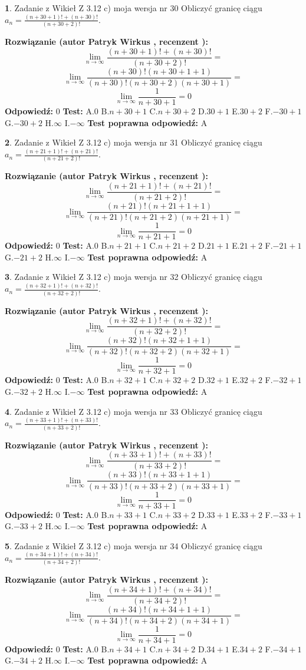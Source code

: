 \documentclass[12pt, a4paper]{article}
\theoremstyle{definition} %
\newtheorem{zad}{}
\newcommand{\zadStart}[1]{\begin{zad}#1\newline}
\newcommand{\zadStop}{\end{zad}}
\newcommand{\rozwStart}[2]{\noindent \textbf{Rozwiązanie (autor #1 , recenzent #2): }\newline}
\newcommand{\rozwStop}{\newline}
\newcommand{\odpStart}{\noindent \textbf{Odpowiedź:}\newline}
\newcommand{\odpStop}{\newline}
\newcommand{\testStart}{\noindent \textbf{Test:}\newline}
\newcommand{\testStop}{\newline}
\newcommand{\kluczStart}{\noindent \textbf{Test poprawna odpowiedź:}\newline}
\newcommand{\kluczStop}{\newline}
\begin{document}
\zadStart{Zadanie z Wikieł Z 3.12 c) moja wersja nr 30}
Obliczyć granicę ciągu $a_{n}=\frac{(n+30+1)!+(n+30)!}{(n+30+2)!}$.
\zadStop
\rozwStart{Patryk Wirkus}{}
$$\lim\limits_{n\to\infty}\frac{(n+30+1)!+(n+30)!}{(n+30+2)!}=$$
$$\lim\limits_{n\to\infty}\frac{(n+30)!(n+30+1+1)}{(n+30)!(n+30+2)(n+30+1)}=$$
$$\lim\limits_{n\to\infty}\frac{1}{n+30+1}= 0$$
\rozwStop
\odpStart
$0$
\odpStop
\testStart
A.$0$
B.$n+30+1$
C.$n+30+2$
D.$30+1$
E.$30+2$
F.$-30+1$
G.$-30+2$
H.$\infty$
I.$-\infty$
\testStop
\kluczStart
A
\kluczStop



\zadStart{Zadanie z Wikieł Z 3.12 c) moja wersja nr 31}
Obliczyć granicę ciągu $a_{n}=\frac{(n+21+1)!+(n+21)!}{(n+21+2)!}$.
\zadStop
\rozwStart{Patryk Wirkus}{}
$$\lim\limits_{n\to\infty}\frac{(n+21+1)!+(n+21)!}{(n+21+2)!}=$$
$$\lim\limits_{n\to\infty}\frac{(n+21)!(n+21+1+1)}{(n+21)!(n+21+2)(n+21+1)}=$$
$$\lim\limits_{n\to\infty}\frac{1}{n+21+1}= 0$$
\rozwStop
\odpStart
$0$
\odpStop
\testStart
A.$0$
B.$n+21+1$
C.$n+21+2$
D.$21+1$
E.$21+2$
F.$-21+1$
G.$-21+2$
H.$\infty$
I.$-\infty$
\testStop
\kluczStart
A
\kluczStop



\zadStart{Zadanie z Wikieł Z 3.12 c) moja wersja nr 32}
Obliczyć granicę ciągu $a_{n}=\frac{(n+32+1)!+(n+32)!}{(n+32+2)!}$.
\zadStop
\rozwStart{Patryk Wirkus}{}
$$\lim\limits_{n\to\infty}\frac{(n+32+1)!+(n+32)!}{(n+32+2)!}=$$
$$\lim\limits_{n\to\infty}\frac{(n+32)!(n+32+1+1)}{(n+32)!(n+32+2)(n+32+1)}=$$
$$\lim\limits_{n\to\infty}\frac{1}{n+32+1}= 0$$
\rozwStop
\odpStart
$0$
\odpStop
\testStart
A.$0$
B.$n+32+1$
C.$n+32+2$
D.$32+1$
E.$32+2$
F.$-32+1$
G.$-32+2$
H.$\infty$
I.$-\infty$
\testStop
\kluczStart
A
\kluczStop



\zadStart{Zadanie z Wikieł Z 3.12 c) moja wersja nr 33}
Obliczyć granicę ciągu $a_{n}=\frac{(n+33+1)!+(n+33)!}{(n+33+2)!}$.
\zadStop
\rozwStart{Patryk Wirkus}{}
$$\lim\limits_{n\to\infty}\frac{(n+33+1)!+(n+33)!}{(n+33+2)!}=$$
$$\lim\limits_{n\to\infty}\frac{(n+33)!(n+33+1+1)}{(n+33)!(n+33+2)(n+33+1)}=$$
$$\lim\limits_{n\to\infty}\frac{1}{n+33+1}= 0$$
\rozwStop
\odpStart
$0$
\odpStop
\testStart
A.$0$
B.$n+33+1$
C.$n+33+2$
D.$33+1$
E.$33+2$
F.$-33+1$
G.$-33+2$
H.$\infty$
I.$-\infty$
\testStop
\kluczStart
A
\kluczStop



\zadStart{Zadanie z Wikieł Z 3.12 c) moja wersja nr 34}
Obliczyć granicę ciągu $a_{n}=\frac{(n+34+1)!+(n+34)!}{(n+34+2)!}$.
\zadStop
\rozwStart{Patryk Wirkus}{}
$$\lim\limits_{n\to\infty}\frac{(n+34+1)!+(n+34)!}{(n+34+2)!}=$$
$$\lim\limits_{n\to\infty}\frac{(n+34)!(n+34+1+1)}{(n+34)!(n+34+2)(n+34+1)}=$$
$$\lim\limits_{n\to\infty}\frac{1}{n+34+1}= 0$$
\rozwStop
\odpStart
$0$
\odpStop
\testStart
A.$0$
B.$n+34+1$
C.$n+34+2$
D.$34+1$
E.$34+2$
F.$-34+1$
G.$-34+2$
H.$\infty$
I.$-\infty$
\testStop
\kluczStart
A
\kluczStop
\end{document}

